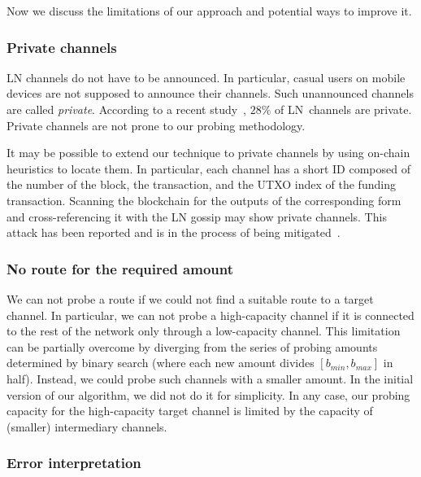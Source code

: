 Now we discuss the limitations of our approach and potential ways to improve it.

\subsubsection*{Private channels}

LN channels do not have to be announced.
In particular, casual users on mobile devices are not supposed to announce their channels.
Such unannounced channels are called \textit{private}.
According to a recent study~\cite{BitMEXPrivateChannels}, $28\%$ of LN~channels are private.
Private channels are not prone to our probing methodology.

It may be possible to extend our technique to private channels by using on-chain heuristics to locate them.
In particular, each channel has a short ID composed of the number of the block, the transaction, and the UTXO index of the funding transaction.
Scanning the blockchain for the outputs of the corresponding form and cross-referencing it with the LN gossip may show private channels.
This attack has been reported and is in the process of being mitigated~\cite{Pickhardt2020}.

\subsubsection*{No route for the required amount}

We can not probe a route if we could not find a suitable route to a target channel.
In particular, we can not probe a high-capacity channel if it is connected to the rest of the network only through a low-capacity channel.
This limitation can be partially overcome by diverging from the series of probing amounts determined by binary search (where each new amount divides $[b_{min}, b_{max}]$ in half).
Instead, we could probe such channels with a smaller amount.
In the initial version of our algorithm, we did not do it for simplicity.
In any case, our probing capacity for the high-capacity target channel is limited by the capacity of (smaller) intermediary channels.

\subsubsection*{Error interpretation}

